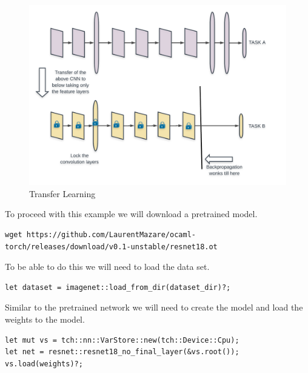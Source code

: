 \documentclass{book}
\begin{document}
\begin{figure}
\begin{center}
	\includegraphics[scale=0.2]{Figures/transfer_learning.png}
\end{center}
\caption{Transfer Learning}
\label{fig:}
\end{figure}

To proceed with this example we will download a pretrained model.

\begin{lstlisting}[caption={chapter6/pytorch-image-classification/src/main.rs}, basicstyle=\small]
wget https://github.com/LaurentMazare/ocaml-torch/releases/download/v0.1-unstable/resnet18.ot
\end{lstlisting}

To be able to do this we will need to load the data set.

\begin{lstlisting}[caption={chapter6/pytorch-image-classification/src/main.rs}, basicstyle=\small]
let dataset = imagenet::load_from_dir(dataset_dir)?;
\end{lstlisting}

Similar to the pretrained network we will need to create the model and load the weights to the model.

\begin{lstlisting}[caption={https://github.com/LaurentMazare/tch-rs/blob/master/examples/transfer-learning/main.rs}, basicstyle=\small]
let mut vs = tch::nn::VarStore::new(tch::Device::Cpu);
let net = resnet::resnet18_no_final_layer(&vs.root());
vs.load(weights)?;
\end{lstlisting}
\end{document}
